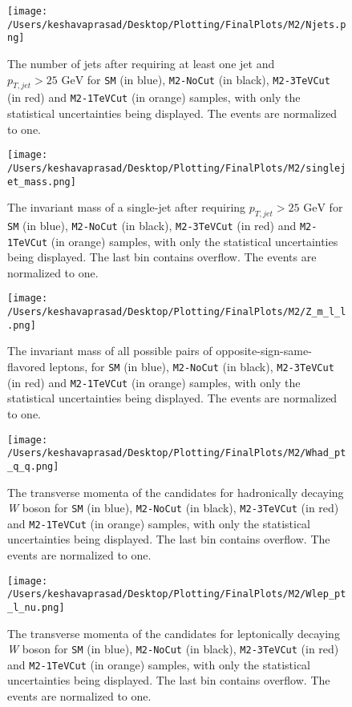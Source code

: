 \begin{figure}[!htb]%
	\centering
	\texttt{[image: /Users/keshavaprasad/Desktop/Plotting/FinalPlots/M2/Njets.png]}
	\caption{The number of jets after requiring at least one jet and $p_{T,jet}>25 \text{ GeV}$  for \texttt{SM} (in blue), \texttt{M2-NoCut} (in black), \texttt{M2-3TeVCut} (in red) and \texttt{M2-1TeVCut} (in orange) samples, with only the statistical uncertainties being displayed. The events are normalized to one.}
	\label{M2NJets-PostCuts}
\end{figure}

\begin{figure}[!htb]
	\centering
	\texttt{[image: /Users/keshavaprasad/Desktop/Plotting/FinalPlots/M2/singlejet\_mass.png]}
	\caption{The invariant mass of a single-jet after requiring $p_{T,jet}>25 \text{ GeV}$ for \texttt{SM} (in blue), \texttt{M2-NoCut} (in black), \texttt{M2-3TeVCut} (in red) and \texttt{M2-1TeVCut} (in orange) samples, with only the statistical uncertainties being displayed. The last bin contains overflow. The events are normalized to one.}
	\label{M2Single Jet Mass -Post Cuts}
\end{figure}

\begin{figure}[!htb]%
	\centering
	\texttt{[image: /Users/keshavaprasad/Desktop/Plotting/FinalPlots/M2/Z\_m\_l\_l.png]}
	\caption{The invariant mass of all possible pairs of opposite-sign-same-flavored leptons, for \texttt{SM} (in blue), \texttt{M2-NoCut} (in black), \texttt{M2-3TeVCut} (in red) and \texttt{M2-1TeVCut} (in orange) samples, with only the statistical uncertainties being displayed. The events are normalized to one.}
	\label{M2-Z Candidate}
\end{figure}

\begin{figure}[!htb]
	\centering
	\texttt{[image: /Users/keshavaprasad/Desktop/Plotting/FinalPlots/M2/Whad\_pt\_q\_q.png]}
	\caption{The transverse momenta of the candidates for hadronically decaying \textit{W} boson for \texttt{SM} (in blue), \texttt{M2-NoCut} (in black), \texttt{M2-3TeVCut} (in red) and \texttt{M2-1TeVCut} (in orange) samples, with only the statistical uncertainties being displayed. The last bin contains overflow. The events are normalized to one.}
	\label{M2-Whad-pT}
\end{figure}

\begin{figure}[!htb]
	\centering
	\texttt{[image: /Users/keshavaprasad/Desktop/Plotting/FinalPlots/M2/Wlep\_pt\_l\_nu.png]}
	\caption{The transverse momenta of the candidates for leptonically decaying \textit{W} boson for \texttt{SM} (in blue), \texttt{M2-NoCut} (in black), \texttt{M2-3TeVCut} (in red) and \texttt{M2-1TeVCut} (in orange) samples, with only the statistical uncertainties being displayed. The last bin contains overflow. The events are normalized to one.}
	\label{M2-WLep-pT}
\end{figure}


